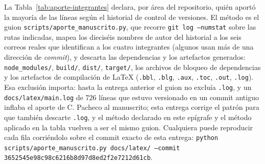 La Tabla~\ref{tab:aporte-integrantes} declara, por área del repositorio, quién aportó la mayoría
de las líneas según el historial de control de versiones. El método es el guion
\texttt{scripts/aporte\_manuscrito.py}, que recorre \texttt{git log --numstat} sobre las rutas
indicadas, mapea los dieciséis nombres de autor del historial a los seis correos reales que
identifican a los cuatro integrantes (algunos usan más de una dirección de \emph{commit}), y
descarta las dependencias y los artefactos generados: \texttt{node\_modules/}, \texttt{build/},
\texttt{dist/}, \texttt{target/}, los archivos de bloqueo de dependencias y los artefactos de
compilación de \LaTeX{} (\texttt{.bbl}, \texttt{.blg}, \texttt{.aux}, \texttt{.toc},
\texttt{.out}, \texttt{.log}). Esa exclusión importa: hasta la entrega anterior el guion no
excluía \texttt{.log}, y un \texttt{docs/latex/main.log} de 726 líneas que estuvo versionado en
un commit antiguo inflaba el aporte de C. Pacheco al manuscrito; esta entrega corrige el patrón
para que también descarte \texttt{.log}, y el método declarado en este epígrafe y el método
aplicado en la tabla vuelven a ser el mismo guion. Cualquiera puede reproducir cada fila
corriéndolo sobre el commit exacto de esta entrega:
\texttt{python scripts/aporte\_manuscrito.py docs/latex/ --commit 3652545e98c98c6216b8d97d8ed2f2e7212d61cb}.

